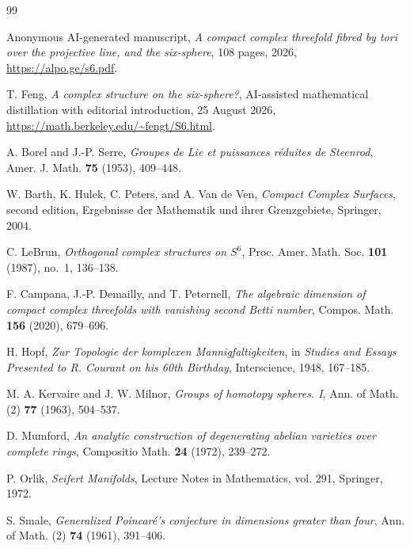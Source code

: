 \documentclass[11pt,reqno]{amsart}
\numberwithin{equation}{section}
\theoremstyle{definition}
\begin{document}
\begin{thebibliography}{99}

Anonymous AI-generated manuscript,
\emph{A compact complex threefold fibred by tori over the projective line, and the six-sphere},
108 pages, 2026,
\url{https://alpo.ge/s6.pdf}.

T. Feng,
\emph{A complex structure on the six-sphere?},
AI-assisted mathematical distillation with editorial introduction, 25 August 2026,
\url{https://math.berkeley.edu/~fengt/S6.html}.

A. Borel and J.-P. Serre,
\emph{Groupes de Lie et puissances r\'eduites de Steenrod},
Amer. J. Math. \textbf{75} (1953), 409--448.

W. Barth, K. Hulek, C. Peters, and A. Van de Ven,
\emph{Compact Complex Surfaces}, second edition,
Ergebnisse der Mathematik und ihrer Grenzgebiete, Springer, 2004.


C. LeBrun,
\emph{Orthogonal complex structures on $S^6$},
Proc. Amer. Math. Soc. \textbf{101} (1987), no.~1, 136--138.

F. Campana, J.-P. Demailly, and T. Peternell,
\emph{The algebraic dimension of compact complex threefolds with vanishing second Betti number},
Compos. Math. \textbf{156} (2020), 679--696.

H. Hopf,
\emph{Zur Topologie der komplexen Mannigfaltigkeiten},
in \emph{Studies and Essays Presented to R. Courant on his 60th Birthday},
Interscience, 1948, 167--185.

M. A. Kervaire and J. W. Milnor,
\emph{Groups of homotopy spheres. I},
Ann. of Math. (2) \textbf{77} (1963), 504--537.

D. Mumford,
\emph{An analytic construction of degenerating abelian varieties over complete rings},
Compositio Math. \textbf{24} (1972), 239--272.

P. Orlik,
\emph{Seifert Manifolds},
Lecture Notes in Mathematics, vol. 291, Springer, 1972.

S. Smale,
\emph{Generalized Poincar\'e's conjecture in dimensions greater than four},
Ann. of Math. (2) \textbf{74} (1961), 391--406.

\end{thebibliography}
\endgroup
\end{document}
